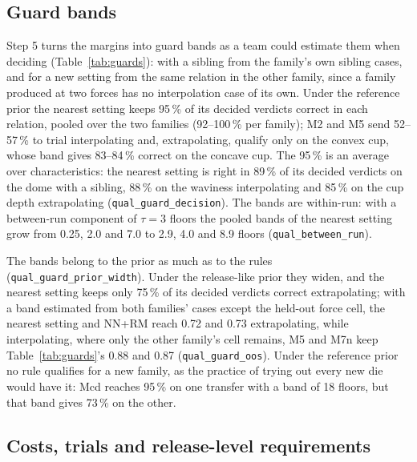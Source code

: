 \documentclass[pdflatex,sn-basic,lineno]{sn-jnl}
\newcommand{\res}[1]{\texttt{#1}}  %
\begin{document}
\subsection{Guard bands}\label{sec:res-procedure}

Step 5 turns the margins into guard bands as a team could estimate them when deciding (Table~\ref{tab:guards}): with a sibling from the family's own sibling cases, and for a new setting from the same relation in the other family, since a family produced at two forces has no interpolation case of its own. Under the reference prior the nearest setting keeps 95\,\% of its decided verdicts correct in each relation, pooled over the two families (92--100\,\% per family); M2 and M5 send 52--57\,\% to trial interpolating and, extrapolating, qualify only on the convex cup, whose band gives 83--84\,\% correct on the concave cup. The 95\,\% is an average over characteristics: the nearest setting is right in 89\,\% of its decided verdicts on the dome with a sibling, 88\,\% on the waviness interpolating and 85\,\% on the cup depth extrapolating (\res{qual\_guard\_decision}). The bands are within-run: with a between-run component of $\tau=3$ floors the pooled bands of the nearest setting grow from 0.25, 2.0 and 7.0 to 2.9, 4.0 and 8.9 floors (\res{qual\_between\_run}).

The bands belong to the prior as much as to the rules (\res{qual\_guard\_prior\_width}). Under the release-like prior they widen, and the nearest setting keeps only 75\,\% of its decided verdicts correct extrapolating; with a band estimated from both families' cases except the held-out force cell, the nearest setting and NN+RM reach 0.72 and 0.73 extrapolating, while interpolating, where only the other family's cell remains, M5 and M7n keep Table~\ref{tab:guards}'s 0.88 and 0.87 (\res{qual\_guard\_oos}). Under the reference prior no rule qualifies for a new family, as the practice of trying out every new die would have it: Mcd reaches 95\,\% on one transfer with a band of 18 floors, but that band gives 73\,\% on the other.

\subsection{Costs, trials and release-level requirements}\label{sec:res-costs}
\end{document}

